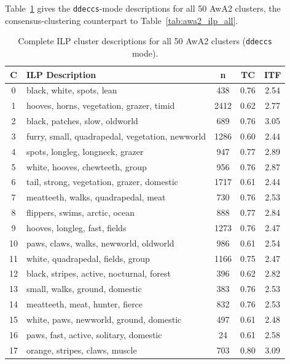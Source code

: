 Table~\ref{tab:awa2_ilp_all_ddeccs} gives the \texttt{ddeccs}-mode descriptions for all 50 AwA2 clusters, the consensus-clustering counterpart to Table~\ref{tab:awa2_ilp_all}.

\begin{table}[H]
    \centering
    \scriptsize
    \caption{Complete ILP cluster descriptions for all 50 AwA2 clusters (\texttt{ddeccs} mode).}
    \label{tab:awa2_ilp_all_ddeccs}
    \begin{tabular}{clccc}
        \toprule
        \textbf{C} & \textbf{ILP Description} & \textbf{n} & \textbf{TC} & \textbf{ITF} \\
        \midrule
        0 & black, white, spots, lean & 438 & 0.76 & 2.54 \\
        1 & hooves, horns, vegetation, grazer, timid & 2412 & 0.62 & 2.77 \\
        2 & black, patches, slow, oldworld & 689 & 0.76 & 3.05 \\
        3 & furry, small, quadrapedal, vegetation, newworld & 1286 & 0.60 & 2.44 \\
        4 & spots, longleg, longneck, grazer & 947 & 0.77 & 2.89 \\
        5 & white, hooves, chewteeth, group & 956 & 0.76 & 2.87 \\
        6 & tail, strong, vegetation, grazer, domestic & 1717 & 0.61 & 2.44 \\
        7 & meatteeth, walks, quadrapedal, meat & 730 & 0.76 & 2.53 \\
        8 & flippers, swims, arctic, ocean & 888 & 0.77 & 2.84 \\
        9 & hooves, longleg, fast, fields & 1273 & 0.76 & 2.47 \\
        10 & paws, claws, walks, newworld, oldworld & 986 & 0.61 & 2.54 \\
        11 & white, quadrapedal, fields, group & 1166 & 0.75 & 2.47 \\
        12 & black, stripes, active, nocturnal, forest & 396 & 0.62 & 2.82 \\
        13 & small, walks, ground, domestic & 383 & 0.76 & 2.53 \\
        14 & meatteeth, meat, hunter, fierce & 832 & 0.76 & 2.53 \\
        15 & white, paws, newworld, ground, domestic & 497 & 0.61 & 2.48 \\
        16 & paws, fast, active, solitary, domestic & 24 & 0.61 & 2.58 \\
        17 & orange, stripes, claws, muscle & 703 & 0.80 & 3.09 \\

\end{tabular}
\end{table}
